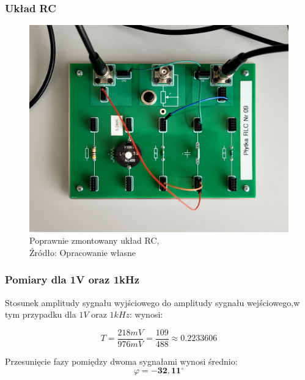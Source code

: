 \documentclass{article}
\begin{document}
      \subsubsection{Układ RC}
        \begin{figure}[!ht]
          \centering
          \includegraphics[scale=0.12]{grafiki/uklad_RC_zdj.png}
          \caption{Poprawnie zmontowany układ RC,
              \\Źródło: Opracowanie własne} 
        \end{figure}

      \subsubsection{Pomiary dla 1V oraz 1kHz}
        Stosunek amplitudy sygnału wyjściowego do amplitudy sygnału wejściowego,w tym przypadku dla $1V$ oraz $1kHz$: wynosi:

        \begin{equation}
          T = \frac{218mV}{976mV} = \frac{109}{488} \approx \mathbf{0.2233606}
        \end{equation}

        Przesunięcie fazy pomiędzy dwoma sygnałami wynosi średnio:
        \begin{equation}
          \varphi = \mathbf{-32,11^\circ}
        \end{equation}
\end{document}
